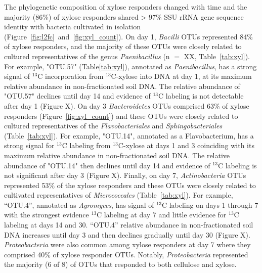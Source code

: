 The phylogenetic composition of xylose responders changed with time and the
majority (86\%) of xylose responders shared > 97\% SSU rRNA gene sequence
identity with bacteria cultivated in isolation
(Figure~\ref{fig:l2fc}~and~\ref{fig:xyl_count}). On day 1, \textit{Bacilli}
OTUs represented 84\% of xylose responders, and the majority of these OTUs were
closely related to cultured representatives of the genus \textit{Paenibacillus}
(n $=$ XX, Table~\ref{tab:xyl}). For example, "OTU.57" (Table\ref{tab:xyl}),
annotated as \textit{Paenibacillus}, has a strong signal of $^{13}$C
incorporation from $^{13}$C-xylose into DNA at day 1, at its maximum relative
abundance in non-fractionated soil DNA. The relative abundance of "OTU.57"
declines until day 14 and evidence of $^{13}$C labeling is not detectable after
day 1 (Figure X). On day 3 \textit{Bacteroidetes} OTUs comprised 63\% of xylose
responders (Figure~\ref{fig:xyl_count}) and these OTUs were closely related to
cultured representatives of the \textit{Flavobacteriales} and
\textit{Sphingobacteriales} (Table~\ref{tab:xyl}). For example, "OTU.14",
annotated as a Flavobacterium, has a strong signal for $^{13}$C labeling from
$^{13}$C-xylose at days 1 and 3 coinciding with its maximum relative abundance
in non-fractionated soil DNA. The relative abundance of "OTU.14" then declines
until day 14 and evidence of $^{13}$C  labeling is not significant after day
3 (Figure X). Finally, on day 7, \textit{Actinobacteria} OTUs represented 53\%
of the xylose responders and these OTUs were closely related to cultivated
representatives of \textit{Micrococcales} (Table~\ref{tab:xyl}). For example,
``OTU.4'', annotated as \textit{Agromyces}, has signal of $^{13}$C labeling on
days 1 through 7 with the strongest evidence $^{13}$C labeling at day 7 and
little evidence for $^{13}$C labeling at days 14 and 30. ``OTU.4'' relative
abundance in non-fractionated soil DNA increases until day 3 and then declines
gradually until day 30 (Figure X). \textit{Proteobacteria} were also common
among xylose responders at day 7 where they comprised 40\% of xylose responder
OTUs. Notably, \textit{Proteobacteria} represented the majority (6 of 8) of
OTUs that responded to both cellulose and xylose. 

